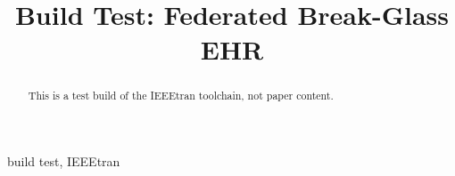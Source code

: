 \documentclass[conference]{IEEEtran}
\begin{document}
\title{Build Test: Federated Break-Glass EHR}
\author{}
\maketitle
\begin{abstract}
This is a test build of the IEEEtran toolchain, not paper content.
\end{abstract}
\begin{IEEEkeywords}
build test, IEEEtran
\end{IEEEkeywords}



\end{document}
